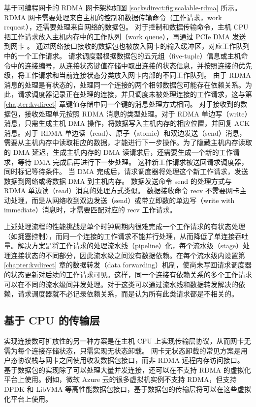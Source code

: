 基于可编程网卡的 RDMA 网卡架构如图 \ref{socksdirect:fig:scalable-rdma} 所示。
RDMA 网卡需要处理来自主机的控制和数据传输命令（工作请求，work request），还需要处理来自网络的数据包。
对于控制和数据传输命令，主机 CPU 把工作请求放入主机内存中的工作队列（work queue），再通过 PCIe DMA 发送到网卡 \cite{kalia2016design}。
通过网络接口接收的数据包也被放入网卡的输入缓冲区，对应工作队列中的一个工作请求。
请求调度器根据数据包的五元组（five-tuple）信息或主机命令中的连接编号，从连接状态键值存储中取出连接的状态信息，并按照连接的优先级，将工作请求和当前连接状态分类放入网卡内部的不同工作队列。
由于 RDMA 消息的处理是有状态的，处理同一个连接的两个相邻数据包可能存在依赖关系。为此，请求调度器记录正在处理的连接，并只调度未被处理连接的工作请求，这与第 \ref{chapter:kvdirect} 章键值存储中同一个键的消息处理方式相同。
对于接收到的数据包，接收处理单元按照 RDMA 消息的类型处理。对于 RDMA 单边写（write）消息，只需生成主机 DMA 操作，将数据写入主机内存的相应位置，并回复 ACK 消息。对于 RDMA 单边读（read）、原子（atomic）和双边发送（send）消息，需要从主机内存中读取相应的数据，才能进行下一步操作。为了隐藏主机内存读取的 DMA 延迟，生成主机内存的 DMA 读请求后，还需要生成一个新的工作请求，等待 DMA 完成后再进行下一步处理。
这种新工作请求被送回请求调度器，同时标记等待条件。
当 DMA 完成后，请求调度器将处理这个新工作请求，发送数据到网络或将数据 DMA 到主机内存。
数据发送命令 send 的处理方式与 RDMA 单边读（read）消息的处理方式类似。
数据接收命令 recv 不需要网卡主动处理，而是从网络收到双边发送（send）或带立即数的单边写（write with immediate）消息时，才需要匹配对应的 recv 工作请求。

上述处理流程的性能挑战是单个时钟周期内很难完成一个工作请求的有状态处理（如拥塞控制），而同一个连接的工作请求不能并行处理，从而降低了单连接吞吐量。解决方案是将工作请求的处理流水线（pipeline）化，每个流水级（stage）处理连接状态的不同部分，因此流水级之间没有数据依赖。在每个流水级内设置第 \ref{chapter:kvdirect} 章的数据转发（data forwarding）机制，使尚未写回请求调度器的状态更新对后续的工作请求可见。这样，同一个连接有依赖关系的多个工作请求可以在不同的流水级间并发处理。对于这类可以通过流水线和数据转发解决的依赖，请求调度器就不必记录依赖关系，而是认为所有此类请求都是不相关的。


\subsection{基于 CPU 的传输层}
\label{socksdirect:subsec:cpu-transport}

实现连接数可扩放性的另一种方案是在主机 CPU 上实现传输层协议，从而网卡无需为每个连接存储状态，只需实现无状态卸载。
网卡无状态卸载的常见方案是用户态协议栈与网卡之间使用收发数据包接口，而非 RDMA 远程内存访问接口。
基于数据包的实现除了可以处理大量并发连接，还可以在不支持 RDMA 的虚拟化平台上使用。例如，微软 Azure 云的很多虚拟机实例不支持 RDMA，但支持 DPDK 和 LibVMA 等高性能数据包接口，基于数据包的传输层将可以在这些虚拟化平台上使用。


